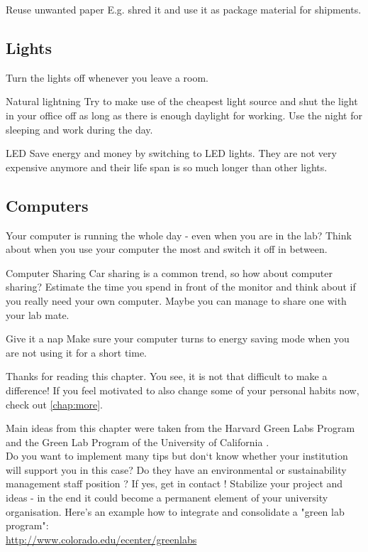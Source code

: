 \begin{suggest}{Reuse unwanted paper}
	E.g. shred it and use it as package material for shipments. 
\end{suggest} 

\subsection{Lights}
	Turn the lights off whenever you leave a room. 
	
\begin{suggest}{Natural lightning}
	Try to make use of the cheapest light source and shut the light in your office off as long as there is enough daylight for working. Use the night for sleeping and work during the day.
\end{suggest} 

\begin{suggest}{LED}
		 Save energy and money by switching to LED lights. They are not very expensive anymore and their life span is so much longer than other lights.
\end{suggest}

\subsection{Computers}
	Your computer is running the whole day - even when you are in the lab? 
	Think about when you use your computer the most and switch it off in between.

\begin{suggest}{Computer Sharing}
	Car sharing is a common trend, so how about computer sharing? 
	Estimate the time you spend in front of the monitor and think about if you really need your own computer. Maybe you can manage to share one with your lab mate. 
\end{suggest}

\begin{suggest}{Give it a nap}
	Make sure your computer turns to energy saving mode when you are not using it for a short time. 
\end{suggest}

Thanks for reading this chapter. You see, it is not that difficult to make a difference! If you feel motivated to also change some of your personal habits now, check out \cref{chap:more}.

Main ideas from this chapter were taken from the Harvard Green Labs Program \cite{GreenHarvard} and the Green Lab Program of the University of California \cite{Greenlab}. \\

Do you want to implement many tips but don`t know whether your institution will support you in this case?
Do they have an environmental or sustainability management staff position ? If yes, get in contact ! Stabilize your project and ideas - in the end it could become a permanent element of your university organisation. 
Here's an example how to integrate and consolidate a "green lab program": \\ \url{http://www.colorado.edu/ecenter/greenlabs}
